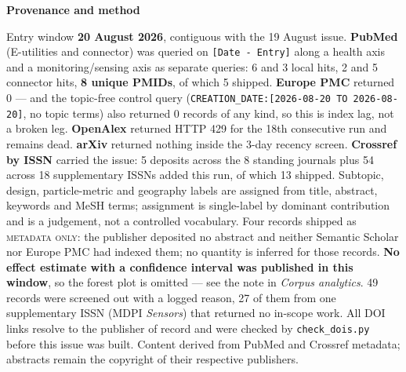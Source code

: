 \documentclass[10pt]{article}
\begin{document}
\vspace{2mm}
\begin{keybox}
{\sffamily\bfseries\footnotesize\color{Deep}Provenance and method}\\[1.2mm]
{\fontsize{7.2}{8.8}\selectfont
Entry window \textbf{20 August 2026}, contiguous with the 19 August issue.
\textbf{PubMed} (E-utilities and connector) was queried on \texttt{[Date - Entry]} along a
health axis and a monitoring/sensing axis as separate queries: 6 and 3 local hits, 2 and 5
connector hits, \textbf{8 unique PMIDs}, of which 5 shipped. \textbf{Europe PMC} returned
0 --- and the topic-free control query (\texttt{CREATION\_DATE:[2026-08-20 TO 2026-08-20]},
no topic terms) also returned 0 records of any kind, so this is index lag, not a broken
leg. \textbf{OpenAlex} returned HTTP 429 for the 18th consecutive run and remains dead.
\textbf{arXiv} returned nothing inside the 3-day recency screen. \textbf{Crossref by
ISSN} carried the issue: 5 deposits across the 8 standing journals plus 54 across 18
supplementary ISSNs added this run, of which 13 shipped.
Subtopic, design, particle-metric and geography labels are assigned from title, abstract,
keywords and MeSH terms; assignment is single-label by dominant contribution and is a
judgement, not a controlled vocabulary. Four records shipped as \textsc{metadata only}:
the publisher deposited no abstract and neither Semantic Scholar nor Europe PMC had
indexed them; no quantity is inferred for those records.
\textbf{No effect estimate with a confidence interval was published in this window}, so
the forest plot is omitted --- see the note in \textit{Corpus analytics}. 49 records were
screened out with a logged reason, 27 of them from one supplementary ISSN (MDPI
\textit{Sensors}) that returned no in-scope work. All DOI links resolve to the publisher
of record and were checked by \texttt{check\_dois.py} before this issue was built.
Content derived from PubMed and Crossref metadata; abstracts remain the copyright of
their respective publishers.\par}
\end{keybox}
\end{document}
